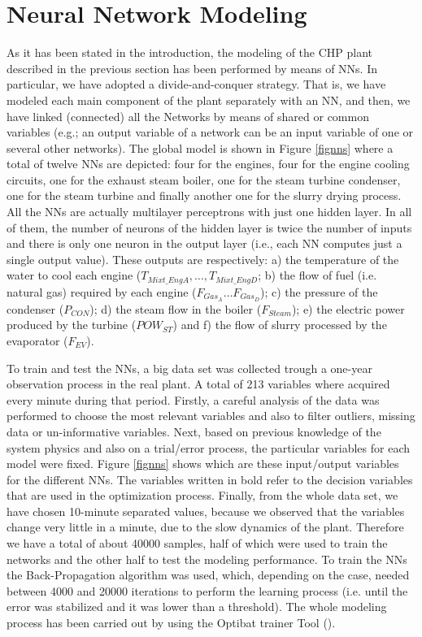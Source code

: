 \section{Neural Network Modeling}
\label{NN}

As it has been stated in the introduction, the modeling of the CHP plant described in the previous section has been performed by means of  NNs. In particular, we have adopted a divide-and-conquer strategy. That is, we have modeled each main component of the plant separately with an NN, and then, we have linked (connected) all the Networks by means of shared or common variables (e.g.; an output variable of a network can be an input variable of one or several other networks). The global model is shown in Figure \ref{fignns} where a total of twelve NNs are depicted: four for the engines, four for the engine cooling  circuits, one for the exhaust steam boiler, one for the steam turbine condenser, one for the steam turbine and finally another one for the slurry drying process. All the NNs are actually multilayer perceptrons with just one hidden layer. In all of them, the number of neurons of the hidden layer is twice the number of inputs and there is only one neuron in the output layer (i.e., each NN computes just a single output value). These outputs are respectively: a) the temperature of the water to cool each engine ($T_{Mixt\_EngA}, \dots, T_{Mixt\_EngD}$; b) the flow of fuel (i.e. natural gas) required by each engine ($F_{Gas_A} \dots F_{Gas_D}$); c) the pressure of the condenser ($P_{CON}$); d) the steam flow in the boiler ($F_{Steam}$); e) the electric power produced by the turbine ($POW_{ST}$) and f) the flow of slurry processed by the evaporator ($F_{EV}$). 

To train and test the NNs, a big data set was collected trough a one-year observation process in the real plant. A total of  213 variables where acquired every minute during that period. Firstly, a careful analysis of the data was performed to choose the most relevant variables and also to filter outliers, missing data or un-informative variables. Next, based on previous knowledge of the system physics and also on a trial/error process, the particular variables for each model were fixed. Figure \ref{fignns} shows which are these input/output variables for the different NNs. The variables written in bold refer to the decision variables that are used in the optimization process. Finally, from the whole data set, we have chosen 10-minute separated values, because we observed that the variables change very little in a minute, due to the slow dynamics of the plant. Therefore we have a total of about \num{40000} samples, half of which were used to train the networks and the other half to test the modeling performance. To train the NNs the Back-Propagation algorithm was used, which, depending on the case, needed between \num{4000} and \num{20000} iterations to perform the learning process (i.e. until the error was stabilized and it was lower than a threshold). The whole modeling process has been carried out by using the Optibat trainer Tool (\cite{Optibat}).

